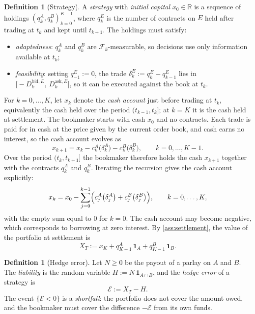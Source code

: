 \documentclass[11pt,a4paper]{article}
\theoremstyle{plain}
\theoremstyle{definition}
\newtheorem{definition}[theorem]{Definition}
\theoremstyle{remark}
\newcommand{\1}{\mathbf{1}}
\newcommand{\F}{\mathcal{F}}
\newcommand{\R}{\mathbb{R}}
\begin{document}
\begin{definition}[Strategy]
\label{def:strategy}
A \emph{strategy} with \emph{initial capital} $x_0\in\R$ is a sequence of holdings $(q^A_k,q^B_k)_{k=0}^{K-1}$, where $q^E_k$ is the number of contracts on $E$ held after trading at $t_k$ and kept until $t_{k+1}$. The holdings must satisfy:
\begin{itemize}
  \item \emph{adaptedness}: $q^A_k$ and $q^B_k$ are $\F_k$-measurable, so decisions use only information available at $t_k$;
  \item \emph{feasibility}: setting $q^E_{-1}:=0$, the trade $\delta^E_k := q^E_k - q^E_{k-1}$ lies in $\bigl[-D^{\mathrm{bid},E}_k,\ D^{\mathrm{ask},E}_k\bigr]$, so it can be executed against the book at $t_k$.
\end{itemize}
\end{definition}

For $k=0,\dots,K$, let $x_k$ denote the \emph{cash account} just before trading at $t_k$, equivalently the cash held over the period $(t_{k-1},t_k]$; at $k=K$ it is the cash held at settlement. The bookmaker starts with cash $x_0$ and no contracts. Each trade is paid for in cash at the price given by the current order book, and cash earns no interest, so the cash account evolves as
\[
x_{k+1} = x_k - c^A_k\bigl(\delta^A_k\bigr) - c^B_k\bigl(\delta^B_k\bigr),\qquad k=0,\dots,K-1.
\]
Over the period $(t_k,t_{k+1}]$ the bookmaker therefore holds the cash $x_{k+1}$ together with the contracts $q^A_k$ and $q^B_k$. Iterating the recursion gives the cash account explicitly:
\[
x_k = x_0 - \sum_{j=0}^{k-1}\Bigl(c^A_j\bigl(\delta^A_j\bigr) + c^B_j\bigl(\delta^B_j\bigr)\Bigr),\qquad k=0,\dots,K,
\]
with the empty sum equal to $0$ for $k=0$. The cash account may become negative, which corresponds to borrowing at zero interest. By \cref{ass:settlement}, the value of the portfolio at settlement is
\[
X_T := x_K + q^A_{K-1}\,\1_A + q^B_{K-1}\,\1_B.
\]

\begin{definition}[Hedge error]
\label{def:error}
Let $N\geq 0$ be the payout of a parlay on $A$ and $B$. The \emph{liability} is the random variable $H := N\,\1_{A\cap B}$, and the \emph{hedge error} of a strategy is
\[
\mathcal{E} := X_T - H.
\]
The event $\{\mathcal{E}<0\}$ is a \emph{shortfall}: the portfolio does not cover the amount owed, and the bookmaker must cover the difference $-\mathcal{E}$ from its own funds.
\end{definition}
\end{document}
